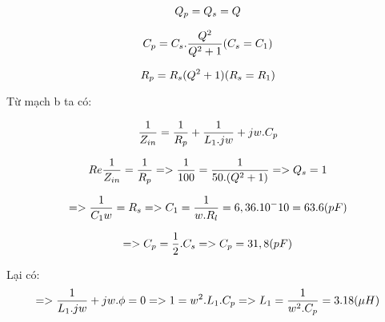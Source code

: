 \documentclass{article}
\begin{document}
\begin{equation}
\Large
Q_{p} = Q_{s} = Q
\end{equation}

\begin{equation}
\Large
C_{p} = C_{s} . \frac{Q^2}{Q^2+1} (C_{s} = C_{1})
\end{equation}

\begin{equation}
\Large
 R_{p} = R_{s} (Q^2+1) (R_{s} = R_{1})
\end{equation}


Từ mạch b ta có: 

\begin{equation}
\Large
 \frac{1}{Z_{in}} = \frac{1}{R_{p}} + \frac{1}{L_{1}.jw} + jw.C_{p}
\end{equation}


\begin{equation}
\Large
Re{\frac{1}{Z_{in}}} = \frac{1}{R_{p}} => \frac{1}{100} = \frac{1}{50.(Q^2+1)} => Q_{s} = 1
\end{equation}

\begin{equation}
\Large
=> \frac{1}{C_{1}w} = R_{s} => C_{1} = \frac{1}{w.R_{l}} = 6,36. 10^-10 =63.6(pF)
\end{equation}


\begin{equation}
\Large
=> C_{p} = \frac{1}{2} . C_{s} => C_{p} = 31,8 (pF)
\end{equation}

Lại có:
\begin{equation}
\Large
=> \frac{1}{L_{1}.jw} + jw.\phi =0 => 1 = w^2.L_{1}.C_{p} => L_{1} = \frac{1}{w^2.C_{p}} = 3.18 (\mu H)
\end{equation}
\end{document}
